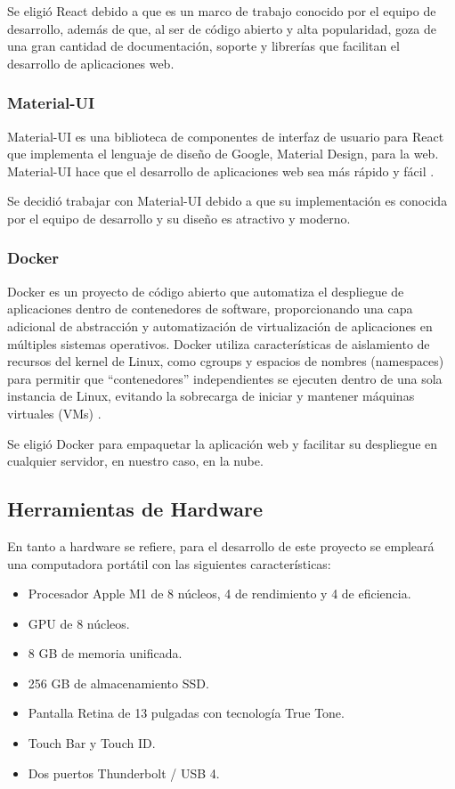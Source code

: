 Se eligió React debido a que es un marco de trabajo conocido por el equipo de
desarrollo, además de que, al ser de código abierto y alta popularidad, goza de
una gran cantidad de documentación, soporte y librerías que facilitan el desarrollo
de aplicaciones web.

\subsubsection{Material-UI}
Material-UI es una biblioteca de componentes de interfaz de usuario para React
que implementa el lenguaje de diseño de Google, Material Design, para la web.
Material-UI hace que el desarrollo de aplicaciones web sea más rápido y fácil \cite{mui_getting_started}.

Se decidió trabajar con Material-UI debido a que su implementación es conocida
por el equipo de desarrollo y su diseño es atractivo y moderno.

\subsubsection{Docker}
Docker es un proyecto de código abierto que automatiza el despliegue de aplicaciones
dentro de contenedores de software, proporcionando una capa adicional de abstracción
y automatización de virtualización de aplicaciones en múltiples sistemas operativos.
Docker utiliza características de aislamiento de recursos del kernel de Linux, como
cgroups y espacios de nombres (namespaces) para permitir que ``contenedores'' independientes
se ejecuten dentro de una sola instancia de Linux, evitando la sobrecarga de iniciar y
mantener máquinas virtuales (VMs) \cite{docker_overview}.

Se eligió Docker para empaquetar la aplicación web y facilitar su despliegue en
cualquier servidor, en nuestro caso, en la nube.

\subsection{Herramientas de Hardware}

En tanto a hardware se refiere, para el desarrollo de este proyecto se empleará
una computadora portátil con las siguientes características:

\begin{itemize}
  \item Procesador Apple M1 de 8 núcleos, 4 de rendimiento y 4 de eficiencia.
  \item GPU de 8 núcleos.
  \item 8 GB de memoria unificada.
  \item 256 GB de almacenamiento SSD.
  \item Pantalla Retina de 13 pulgadas con tecnología True Tone.
  \item Touch Bar y Touch ID.
  \item Dos puertos Thunderbolt / USB 4.
\end{itemize}

